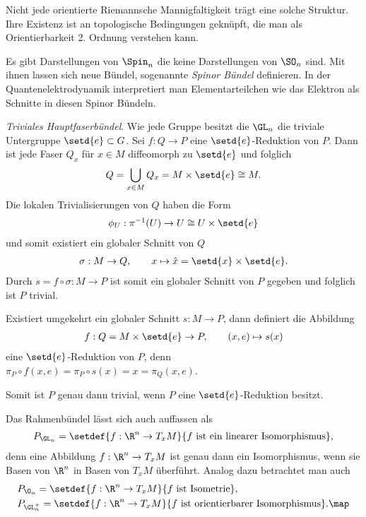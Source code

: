 \documentclass[%
	paper=a5,%
	fleqn,%
	DIV=18,%
	BCOR=0mm,
	fontsize=11pt,
	titlepage=false,%
	bibliography=totoc,
	DIV=18,%
	twoside=true,
	pdftitle=Riemannsche Geometrie,
	pdfauthor=Uwe Semmelmann,
	numbers=noendperiod]%
	{scrbook}
\begin{document}
\begin{ex}
\begin{exenum}
Nicht jede orientierte Riemannsche Mannigfaltigkeit trägt eine solche
Struktur. Ihre Existenz ist an topologische Bedingungen geknüpft, die man
als Orientierbarkeit 2. Ordnung verstehen kann.

Es gibt Darstellungen von $\Spin_n$ die keine Darstellungen von $\SO_n$ sind.
Mit ihnen lassen sich neue Bündel, sogenannte \emph{Spinor Bündel} definieren.
In der Quantenelektrodynamik interpretiert man Elementarteilchen wie das
Elektron als Schnitte in diesen Spinor Bündeln.
\item \textit{Triviales Hauptfaserbündel}.
Wie jede Gruppe besitzt die $\GL_n$ die triviale Untergruppe
$\setd{e}\subset G$. Sei $f: Q\to P$ eine $\setd{e}$-Reduktion von $P$. Dann
ist jede Faser $Q_x$ für $x\in M$ diffeomorph zu $\setd{e}$ und folglich
\begin{align*}
Q = \bigcup_{x\in M} Q_x = M\times \setd{e}\cong M. 
\end{align*} 
Die lokalen Trivialisierungen von $Q$ haben die Form
\begin{align*}
\phi_U : \pi^{-1}(U) \to U\cong U\times\setd{e}
\end{align*}
und somit existiert ein globaler Schnitt von $Q$
\begin{align*}
\sigma : M\to Q,\qquad x\mapsto \hat{x} = \setd{x}\times\setd{e}.
\end{align*}
Durch $s = f\circ \sigma: M\to P$ ist somit ein globaler Schnitt von $P$ gegeben
und folglich ist $P$ trivial.

Existiert umgekehrt ein globaler Schnitt $s: M\to P$, dann definiert die
Abbildung
\begin{align*}
f: Q=M\times\setd{e}\to P,\qquad (x,e)\mapsto s(x)
\end{align*}
eine $\setd{e}$-Reduktion von $P$, denn $\pi_P\circ f(x,e) = \pi_P\circ s(x) = x
= \pi_Q(x,e)$.

Somit ist $P$ genau dann trivial, wenn $P$ eine $\setd{e}$-Reduktion
besitzt.\bsp
\end{exenum}
\end{ex}

\begin{rem}
Das Rahmenbündel lässt sich auch auffassen als
\begin{align*}
P_{\GL_n} = \setdef{f: \R^n\to T_x M}{f \text{ ist ein linearer Isomorphismus}},
\end{align*}
denn eine Abbildung $f: \R^n\to T_xM$ ist genau dann ein Isomorphismus, wenn sie
Basen von $\R^n$ in Basen von $T_xM$ überführt.
Analog dazu betrachtet man auch
\begin{align*}
&P_{\O_n} = \setdef{f: \R^n\to T_x M}{f\text{ ist Isometrie}},\\
&P_{\GL_n^+} = \setdef{f: \R^n\to T_x M}{f\text{ ist orientierbarer
Isomorphismus}}.\map
\end{align*} 
\end{rem}
\end{document}
